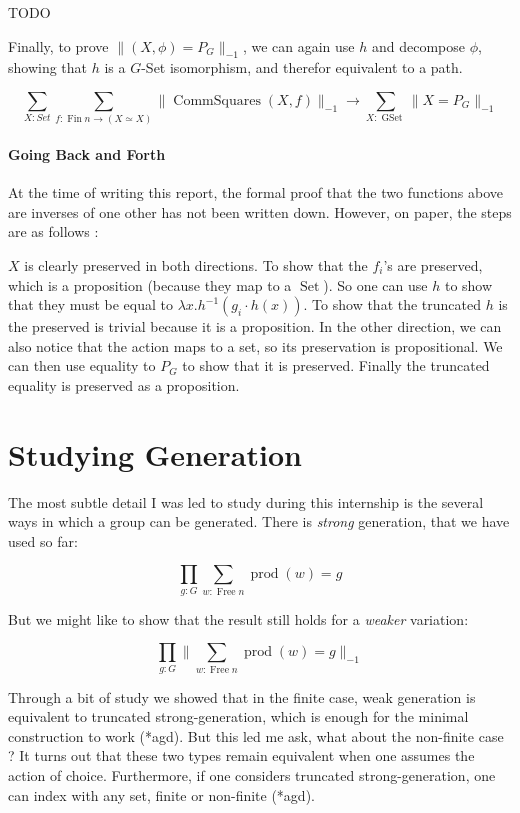 \documentclass{article}
\DeclareMathOperator{\product}{prod}
\DeclareMathOperator{\fin}{Fin}
\DeclareMathOperator{\free}{Free}
\DeclareMathOperator{\gset}{GSet}
\DeclareMathOperator{\set}{Set}
\DeclareMathOperator{\commutingsquares}{CommSquares}
\begin{document}
 TODO

 Finally, to prove $\|(X,\phi) = P_{G} \|_{-1}$, we can again use $h$ and decompose $\phi$, showing that $h$ is a $G$-Set isomorphism, and therefor equivalent to a path.

 \[\sum_{X : Set} \sum_{f : \fin n \to (X \simeq X)} \| \commutingsquares(X,f) \|_{-1} \to \sum_{X : \gset} \| X = P_{G} \|_{-1}\]

 \paragraph{Going Back and Forth}

 At the time of writing this report, the formal proof that the two functions above are inverses of one other has not been written down. However, on paper, the steps are as follows :

 $X$ is clearly preserved in both directions. To show that the $f_{i}$'s are preserved, which is a proposition (because they map to a $\set$). So one can use $h$ to show that they must be equal to $\lambda x . h^{-1} (g_{i} \cdot h(x))$. To show that the truncated $h$ is the preserved is trivial because it is a proposition. In the other direction, we can also notice that the action maps to a set, so its preservation is propositional. We can then use equality to $P_{G}$ to show that it is preserved. Finally the truncated equality is preserved as a proposition.

 \section{Studying Generation}

 The most subtle detail I was led to study during this internship is the several ways in which a group can be generated. There is \emph{strong} generation, that we have used so far:

 \[\prod_{g : G} \sum_{w : \free n} \product(w) = g\]

 But we might like to show that the result still holds for a \emph{weaker} variation:


 \[\prod_{g : G} \| \sum_{w : \free n} \product(w) = g \|_{-1}\]

 Through a bit of study we showed that in the finite case, weak generation is equivalent to truncated strong-generation, which is enough for the minimal construction to work (*agd). But this led me ask, what about the non-finite case ? It turns out that these two types remain equivalent when one assumes the action of choice. Furthermore, if one considers truncated strong-generation, one can index with any set, finite or non-finite (*agd).
\end{document}
